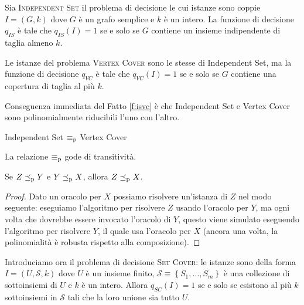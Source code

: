 Sia \textsc{Independent Set} il problema di decisione le cui istanze sono coppie $I = (G,k)$ dove $G$ è un grafo semplice e $k$ è un intero. La funzione di decisione $q_{IS}$ è tale che $q_{IS} (I) = 1$ se e solo se $G$ contiene un insieme indipendente di taglia almeno $k$.

Le istanze del problema \textsc{Vertex Cover} sono le stesse di Independent Set, ma la funzione di decisione $q_{VC}$ è tale che $q_{VC} (I) = 1$ se e solo se $G$ contiene una copertura di taglia al più $k$. 

Conseguenza immediata del Fatto \ref{f:isvc} è che Independent Set e Vertex Cover sono polinomialmente riducibili l'uno con l'altro. \\

\begin{cor}
    Independent Set $\equiv_\text{p}$ Vertex Cover
\end{cor}

La relazione $\equiv_\text{p}$ gode di transitività. \\

\begin{fact}
    Se $Z \preceq_\text{p} Y$ e $Y \preceq_\text{p} X$, allora $Z \preceq_\text{p} X$.
\end{fact}
\begin{proof}
    Dato un oracolo per $X$ possiamo risolvere un'istanza di $Z$ nel modo seguente: eseguiamo l'algoritmo per risolvere $Z$ usando l'oracolo per $Y$, ma ogni volta che dovrebbe essere invocato l'oracolo di $Y$, questo viene simulato eseguendo l'algoritmo per risolvere $Y$, il quale usa l'oracolo per $X$ (ancora una volta, la polinomialità è robusta rispetto alla composizione).
\end{proof}

Introduciamo ora il problema di decisione \textsc{Set Cover}: le istanze sono della forma $I = (U, \mathcal{S}, k)$ dove $U$ è un insieme finito, $\mathcal{S} \equiv \left\{S_1, \dots, S_m \right\}$ è una collezione di sottoinsiemi di $U$ e $k$ è un intero. Allora $q_{SC} (I) = 1$ se e solo se esistono al più $k$ sottoinsiemi in $\mathcal{S}$ tali che la loro unione sia tutto $U$.\\

